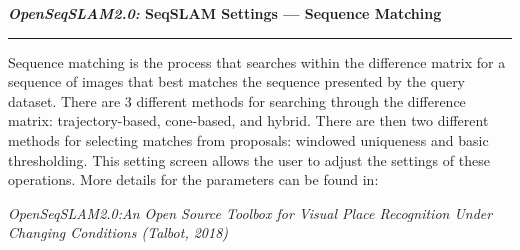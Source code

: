 \centerline{\textbf{\textit{OpenSeqSLAM2.0:} SeqSLAM Settings --- Sequence Matching}}
\noindent\rule{\textwidth}{2pt}
\bigskip
\parbox{\textwidth}{Sequence matching is the process that searches within the difference matrix for a sequence of images that best matches the sequence presented by the query dataset. There are 3 different methods for searching through the difference matrix: trajectory-based, cone-based, and hybrid. There are then two different methods for selecting matches from proposals: windowed uniqueness and basic thresholding. This setting screen allows the user to adjust the settings of these operations. More details for the parameters can be found in:}
\smallskip
\parbox{\textwidth}{\textit{OpenSeqSLAM2.0:\@ An Open Source Toolbox for Visual Place Recognition Under Changing Conditions (Talbot, 2018)}}
\bigskip
